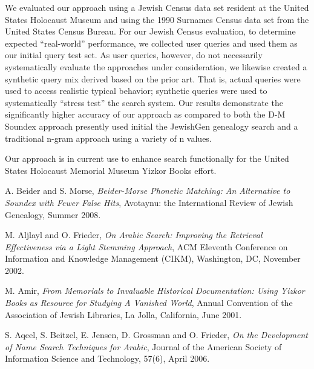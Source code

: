 \documentclass{endm}
\begin{document}
\begin{CJK}{UTF8}{song}
We evaluated our approach using a Jewish Census data set resident at the United States Holocaust Museum and using the 1990 Surnames Census data set from the United States Census Bureau.  For our Jewish Census evaluation, to determine expected ``real-world'' performance, we collected user queries and used them as our initial query test set.  As user queries, however, do not necessarily systematically evaluate the approaches under consideration, we likewise created a synthetic query mix derived based on the prior art.  That is, actual queries were used to access realistic typical behavior; synthetic queries were used to systematically ``stress test'' the search system.  Our results demonstrate the significantly higher accuracy of our approach as compared to both the D-M Soundex approach presently used initial the JewishGen genealogy search and a traditional n-gram approach using a variety of n values.

Our approach is in current use to enhance search functionally for the United States Holocaust Memorial Museum Yizkor Books effort.

 


%



\begin{thebibliography}{1}
	
 A. Beider and S. Morse, {\em 	Beider-Morse Phonetic Matching:	An Alternative to Soundex with Fewer False Hits}, Avotaynu: the International Review of Jewish Genealogy, Summer 2008.

M. Aljlayl and O. Frieder, {\em On Arabic Search:  Improving the Retrieval Effectiveness via a Light Stemming Approach}, ACM Eleventh Conference on Information and Knowledge Management (CIKM), Washington, DC, November 2002.

 M. Amir, {\em From Memorials to Invaluable Historical Documentation: Using Yizkor Books as Resource for Studying A Vanished World}, Annual Convention of the Association of Jewish Libraries, La Jolla, California, June 2001.

 S. Aqeel, S. Beitzel, E. Jensen, D. Grossman and O. Frieder, {\em On the Development of Name Search Techniques for Arabic}, Journal of the American Society of Information Science and Technology, 57(6), April 2006.


\end{thebibliography}
\end{CJK}
\end{document}
